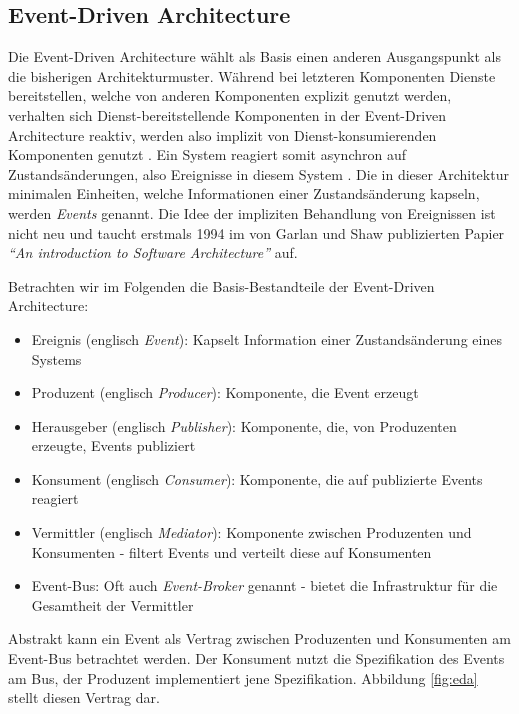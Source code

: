 \documentclass[acmtog]{acmart}
\begin{document}
\subsection{Event-Driven Architecture}
\label{subsec:eda}
Die Event-Driven Architecture wählt als Basis einen anderen Ausgangspunkt als die bisherigen Architekturmuster.
Während bei letzteren Komponenten Dienste bereitstellen, welche von anderen Komponenten explizit genutzt werden,
verhalten sich Dienst-bereitstellende Komponenten in der Event-Driven Architecture reaktiv,
werden also implizit von Dienst-konsumierenden Komponenten genutzt \cite{garlanShawImplizit}.
Ein System reagiert somit asynchron auf Zustandsänderungen, also Ereignisse in diesem System \cite{eda}.
Die in dieser Architektur minimalen Einheiten, welche Informationen einer Zustandsänderung kapseln, werden \textit{Events} genannt.
Die Idee der impliziten Behandlung von Ereignissen ist nicht neu und taucht erstmals 1994 im von Garlan und Shaw publizierten Papier
\textit{\enquote{An introduction to Software Architecture}} auf.

Betrachten wir im Folgenden die Basis-Bestandteile der Event-Driven Architecture:
\begin{itemize}
  \item Ereignis (englisch \textit{Event}): Kapselt Information einer Zustandsänderung eines Systems
  \item Produzent (englisch \textit{Producer}): Komponente, die Event erzeugt
  \item Herausgeber (englisch \textit{Publisher}): Komponente, die, von Produzenten erzeugte, Events publiziert
  \item Konsument (englisch \textit{Consumer}): Komponente, die auf publizierte Events reagiert
  \item Vermittler (englisch \textit{Mediator}): Komponente zwischen Produzenten und Konsumenten - filtert Events und verteilt diese auf Konsumenten
  \item Event-Bus: Oft auch \textit{Event-Broker} genannt - bietet die Infrastruktur für die Gesamtheit der Vermittler
\end{itemize}
Abstrakt kann ein Event als Vertrag zwischen Produzenten und Konsumenten am Event-Bus betrachtet werden.
Der Konsument nutzt die Spezifikation des Events am Bus, der Produzent implementiert jene Spezifikation.
Abbildung \ref{fig:eda} stellt diesen Vertrag dar.
\end{document}

